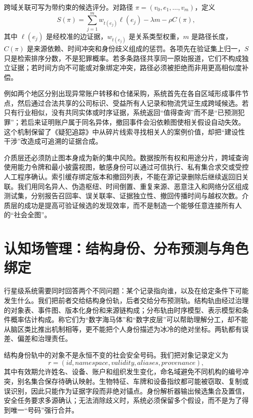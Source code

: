 跨域关联可写为带约束的候选评分。对路径 $\pi=(v_0,e_1,\ldots,v_m)$，定义
\begin{equation}
 S(\pi)=\sum_{j=1}^{m}w_{t(e_j)}\ell(e_j)-\lambda m-\rho C(\pi),
\end{equation}
其中 $\ell(e_j)$ 是经校准的边证据，$w_{t(e_j)}$ 是关系类型权重，$m$ 是路径长度，$C(\pi)$ 是来源依赖、时间冲突和身份歧义组成的惩罚。各项先在验证集上归一，$S$ 只是检索排序分数，不是犯罪概率。若多条路径共享同一原始报道，它们不构成独立证据；若时间方向不可能或对象绑定冲突，路径必须被拒绝而非用更高相似度补偿。

例如两个地区分别出现异常账户转移和仓储采购，系统首先在各自区域形成事件节点，然后通过合法共享的公司标识、受益所有人记录和物流凭证生成跨域候选。若只有行业相似，没有共同实体或时序证据，系统返回“值得查询”而不是“已预测犯罪”；若后来证明账户属于同名异体，撤回事件会沿依赖图使相关假设自动失效。这个机制保留了《疑犯追踪》中从碎片线索寻找相关人的案例价值，却把“建设性干涉”改造成可追溯的证据合成。

介质层还必须防止图本身成为新的集中风险。数据按所有权和用途分片，跨域查询使用能力令牌和最小披露视图，敏感身份可以通过可信执行、私有集合求交或受控人工程序确认。索引缓存绑定版本和撤回列表，不能在源记录删除后继续返回旧关联。我们用同名异人、伪造枢纽、时间倒置、重复来源、恶意注入和网络分区组成测试集，分别报告召回率、误关联率、证据独立性、撤回传播时间与越权次数。介质层的成功是提高可验证候选的发现效率，而不是制造一个能够任意连接所有人的“社会全图”。

\section{认知场管理：结构身份、分布预测与角色绑定}
\label{sec:gaia_dual_track}

行星级系统需要同时回答两个不同问题：某个记录指向谁，以及在给定条件下可能发生什么。我们把前者交给结构身份轨，后者交给分布预测轨。结构轨由经过治理的对象表、事件图、版本化身份和来源链构成；分布轨由时序模型、表示模型和条件概率估计构成。称它们为“数字海马体”和“数字皮层”可以帮助理解分工，却不能从脑区类比推出机制相等，更不能把个人身份描述为冰冷的绝对坐标。两轨都有误差、偏差和治理责任。

结构身份轨中的对象不是永恒不变的社会安全号码。我们把对象记录定义为
\begin{equation}
 r=(id,namespace,validity,aliases,provenance),
\end{equation}
其中有效期允许姓名、设备、账户和组织发生变化，命名域避免不同机构的编号冲突，别名集合保存待确认映射。生物特征、车牌和设备指纹都可能被窃取、复制或误识别，因此只能作为证据字段而非绝对锚点。身份解析器输出候选集合及置信，安全任务要求多源确认；无法消除歧义时，系统必须保留多个假设，而不是为了得到唯一“号码”强行合并。

